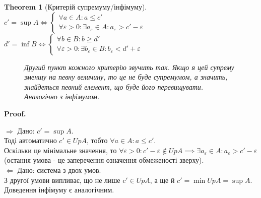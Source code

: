 \documentclass[a4paper, 14pt]{article}
\makeatletter
\def\qed{$\blacksquare$}
\def\rightproof{$\boxed{\Rightarrow}$ }
\def\leftproof{$\boxed{\Leftarrow}$ }
\theoremstyle{theoremdd}
\newtheorem{theorem}{Theorem}[subsection]
\theoremstyle{theoremdd}
\theoremstyle{theoremdd}
\theoremstyle{theoremdd}
\theoremstyle{theoremdd}
\theoremstyle{theoremdd}
\theoremstyle{theoremdd}
\theoremstyle{theoremdd}
\renewenvironment{proof}[1][Proof.\\]{\par
\pushQED{\hfill \qed}%
\normalfont \topsep6\p@\@plus6\p@\relax
\trivlist
\item\relax
{\bfseries
#1\@addpunct{.}}\hspace\labelsep\ignorespaces
}{%
\popQED\endtrivlist\@endpefalse
}
\makeatother
\begin{document}
	\begin{theorem}[Критерій супремуму/інфімуму]
	$c' = \sup A \iff \begin{cases} 
	 \forall a \in A: a \leq c' \\
	 \forall \varepsilon > 0: \exists a_{\varepsilon} \in A: a_{\varepsilon} > c' - \varepsilon
	\end{cases}$ \hspace{0.1cm}
	$d' = \inf B \iff \begin{cases} 
	 \forall b \in B: b \geq d'\\
	 \forall \varepsilon > 0: \exists b_{\varepsilon} \in B: b_{\varepsilon} < d' + \varepsilon
	\end{cases}$
	\begin{figure}[H]
	\centering
	\qquad
	\caption*{Другий пункт кожного критерію звучить так. Якщо я цей супрему зменшу на певну величину, то це не буде супремумом, а значить, знайдеться певний елемент, що буде його перевищувати. Аналогічно з інфімумом.}
	\end{figure}
	\end{theorem}
	
	\begin{proof}
	\rightproof Дано: $c' = \sup A$.\\
	Тоді автоматично $c' \in UpA$, тобто $\forall a \in A: a \leq c'$.\\
	Оскільки це мінімальне значення, то $\forall \varepsilon > 0: c' - \varepsilon \notin UpA \implies \exists a_{\varepsilon} \in A: a_{\varepsilon} > c' - \varepsilon$\\
	(остання умова - це заперечення означення обмеженості зверху).
	\bigskip \\
	\leftproof Дано: система з двох умов.\\
	З другої умови випливає, що не лише $c' \in UpA$, а ще й $c' = \min UpA = \sup A$.
	\bigskip \\
	Доведення інфімуму є аналогічним.
	\end{proof}
	
\end{document}
